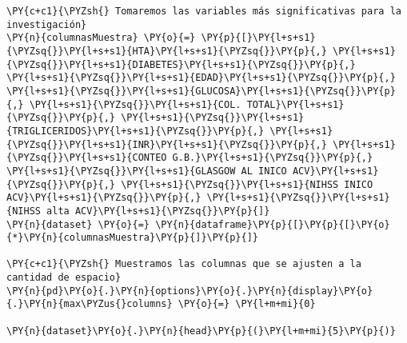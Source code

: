     \begin{tcolorbox}[breakable, size=fbox, boxrule=1pt, pad at break*=1mm,colback=cellbackground, colframe=cellborder]
\begin{Verbatim}[commandchars=\\\{\}]
\PY{c+c1}{\PYZsh{} Tomaremos las variables más significativas para la investigación}
\PY{n}{columnasMuestra} \PY{o}{=} \PY{p}{[}\PY{l+s+s1}{\PYZsq{}}\PY{l+s+s1}{HTA}\PY{l+s+s1}{\PYZsq{}}\PY{p}{,} \PY{l+s+s1}{\PYZsq{}}\PY{l+s+s1}{DIABETES}\PY{l+s+s1}{\PYZsq{}}\PY{p}{,} \PY{l+s+s1}{\PYZsq{}}\PY{l+s+s1}{EDAD}\PY{l+s+s1}{\PYZsq{}}\PY{p}{,} \PY{l+s+s1}{\PYZsq{}}\PY{l+s+s1}{GLUCOSA}\PY{l+s+s1}{\PYZsq{}}\PY{p}{,} \PY{l+s+s1}{\PYZsq{}}\PY{l+s+s1}{COL. TOTAL}\PY{l+s+s1}{\PYZsq{}}\PY{p}{,} \PY{l+s+s1}{\PYZsq{}}\PY{l+s+s1}{TRIGLICERIDOS}\PY{l+s+s1}{\PYZsq{}}\PY{p}{,} \PY{l+s+s1}{\PYZsq{}}\PY{l+s+s1}{INR}\PY{l+s+s1}{\PYZsq{}}\PY{p}{,} \PY{l+s+s1}{\PYZsq{}}\PY{l+s+s1}{CONTEO G.B.}\PY{l+s+s1}{\PYZsq{}}\PY{p}{,} \PY{l+s+s1}{\PYZsq{}}\PY{l+s+s1}{GLASGOW AL INICO ACV}\PY{l+s+s1}{\PYZsq{}}\PY{p}{,} \PY{l+s+s1}{\PYZsq{}}\PY{l+s+s1}{NIHSS INICO ACV}\PY{l+s+s1}{\PYZsq{}}\PY{p}{,} \PY{l+s+s1}{\PYZsq{}}\PY{l+s+s1}{NIHSS alta ACV}\PY{l+s+s1}{\PYZsq{}}\PY{p}{]}
\PY{n}{dataset} \PY{o}{=} \PY{n}{dataframe}\PY{p}{[}\PY{p}{[}\PY{o}{*}\PY{n}{columnasMuestra}\PY{p}{]}\PY{p}{]}

\PY{c+c1}{\PYZsh{} Muestramos las columnas que se ajusten a la cantidad de espacio}
\PY{n}{pd}\PY{o}{.}\PY{n}{options}\PY{o}{.}\PY{n}{display}\PY{o}{.}\PY{n}{max\PYZus{}columns} \PY{o}{=} \PY{l+m+mi}{0}

\PY{n}{dataset}\PY{o}{.}\PY{n}{head}\PY{p}{(}\PY{l+m+mi}{5}\PY{p}{)}
\end{Verbatim}
\end{tcolorbox}

